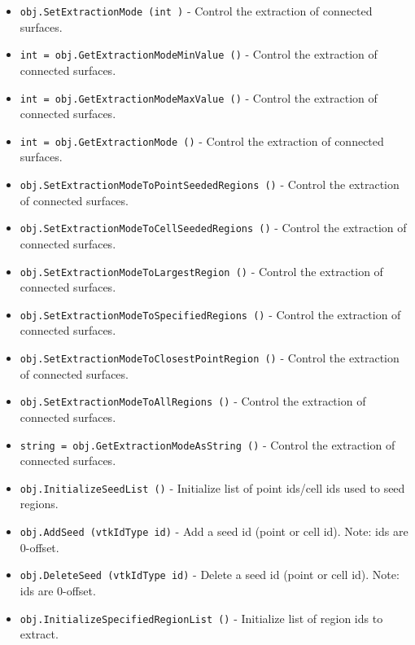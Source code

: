 \begin{itemize}
\item  \verb|obj.SetExtractionMode (int )| -  Control the extraction of connected surfaces.

\item  \verb|int = obj.GetExtractionModeMinValue ()| -  Control the extraction of connected surfaces.

\item  \verb|int = obj.GetExtractionModeMaxValue ()| -  Control the extraction of connected surfaces.

\item  \verb|int = obj.GetExtractionMode ()| -  Control the extraction of connected surfaces.

\item  \verb|obj.SetExtractionModeToPointSeededRegions ()| -  Control the extraction of connected surfaces.

\item  \verb|obj.SetExtractionModeToCellSeededRegions ()| -  Control the extraction of connected surfaces.

\item  \verb|obj.SetExtractionModeToLargestRegion ()| -  Control the extraction of connected surfaces.

\item  \verb|obj.SetExtractionModeToSpecifiedRegions ()| -  Control the extraction of connected surfaces.

\item  \verb|obj.SetExtractionModeToClosestPointRegion ()| -  Control the extraction of connected surfaces.

\item  \verb|obj.SetExtractionModeToAllRegions ()| -  Control the extraction of connected surfaces.

\item  \verb|string = obj.GetExtractionModeAsString ()| -  Control the extraction of connected surfaces.

\item  \verb|obj.InitializeSeedList ()| -  Initialize list of point ids/cell ids used to seed regions.

\item  \verb|obj.AddSeed (vtkIdType id)| -  Add a seed id (point or cell id). Note: ids are 0-offset.

\item  \verb|obj.DeleteSeed (vtkIdType id)| -  Delete a seed id (point or cell id). Note: ids are 0-offset.

\item  \verb|obj.InitializeSpecifiedRegionList ()| -  Initialize list of region ids to extract.


\end{itemize}
